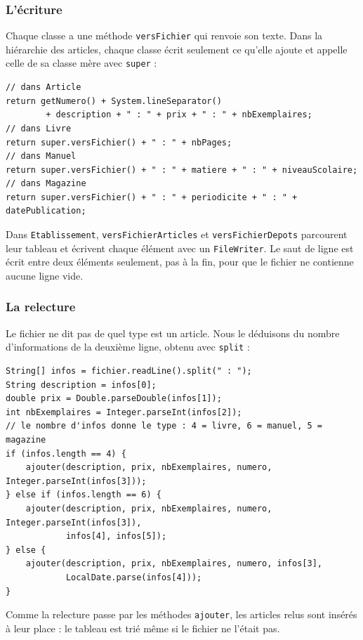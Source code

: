 \documentclass[11pt,a4paper]{article}
\newcommand{\code}[1]{\texttt{#1}}
\begin{document}
\subsubsection*{L'écriture}

Chaque classe a une méthode \code{versFichier} qui renvoie son texte. Dans la hiérarchie des
articles, chaque classe écrit seulement ce qu'elle ajoute et appelle celle de sa classe mère avec
\code{super} :

\begin{lstlisting}
// dans Article
return getNumero() + System.lineSeparator()
        + description + " : " + prix + " : " + nbExemplaires;
// dans Livre
return super.versFichier() + " : " + nbPages;
// dans Manuel
return super.versFichier() + " : " + matiere + " : " + niveauScolaire;
// dans Magazine
return super.versFichier() + " : " + periodicite + " : " + datePublication;
\end{lstlisting}

Dans \code{Etablissement}, \code{versFichierArticles} et \code{versFichierDepots} parcourent leur
tableau et écrivent chaque élément avec un \code{FileWriter}. Le saut de ligne est écrit entre deux
éléments seulement, pas à la fin, pour que le fichier ne contienne aucune ligne vide.

\subsubsection*{La relecture}

Le fichier ne dit pas de quel type est un article. Nous le déduisons du nombre d'informations de la
deuxième ligne, obtenu avec \code{split} :

\begin{lstlisting}
String[] infos = fichier.readLine().split(" : ");
String description = infos[0];
double prix = Double.parseDouble(infos[1]);
int nbExemplaires = Integer.parseInt(infos[2]);
// le nombre d'infos donne le type : 4 = livre, 6 = manuel, 5 = magazine
if (infos.length == 4) {
    ajouter(description, prix, nbExemplaires, numero, Integer.parseInt(infos[3]));
} else if (infos.length == 6) {
    ajouter(description, prix, nbExemplaires, numero, Integer.parseInt(infos[3]),
            infos[4], infos[5]);
} else {
    ajouter(description, prix, nbExemplaires, numero, infos[3],
            LocalDate.parse(infos[4]));
}
\end{lstlisting}

Comme la relecture passe par les méthodes \code{ajouter}, les articles relus sont insérés à leur
place : le tableau est trié même si le fichier ne l'était pas.
\end{document}
